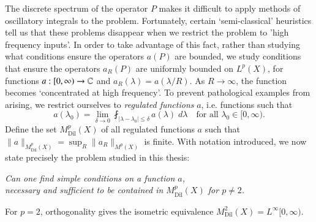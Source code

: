 The discrete spectrum of the operator $P$ makes it difficult to apply methods of oscillatory integrals to the problem. Fortunately, certain `semi-classical' heuristics tell us that these problems disappear when we restrict the problem to 'high frequency inputs'. In order to take advantage of this fact, rather than studying what conditions ensure the operators $a(P)$ are bounded, we study conditions that ensure the operators $a_R(P)$ are uniformly bounded on $L^p(X)$, for functions $a: [0,\infty) \to \operatorname{\mathbb{C}}$ and $a_R(\lambda) = a(\lambda/R)$. As $R \to \infty$, the function becomes `concentrated at high frequency'. %
To prevent pathological examples from arising, we restrict ourselves to \emph{regulated functions} $a$, i.e. functions such that
%
\begin{equation}
  a(\lambda_0) = \lim_{\delta \to 0} \fint_{|\lambda - \lambda_0| \leq \delta} a(\lambda)\; d\lambda \quad \text{for all $\lambda_0 \in [0,\infty)$}.
\end{equation}
%
%
%
Define the set $M^p_{\text{Dil}}(X)$ of all regulated functions $a$ such that $\| a \|_{M^p_{\text{Dil}}(X)} = \sup_R \| a_R \|_{M^p(X)}$ is finite. With notation introduced, we now state precisely the problem studied in this thesis:
\begin{changemargin}{2cm}{2cm}
\begin{center}
  \emph{Can one find simple conditions on a function $a$,\\
  necessary and sufficient to be contained in $M^p_{\text{Dil}}(X)$ for $p \neq 2$.}
\end{center}
\end{changemargin}
%
For $p = 2$, orthogonality gives the isometric equivalence $M^2_{\text{Dil}}(X) = L^\infty[0,\infty)$.

